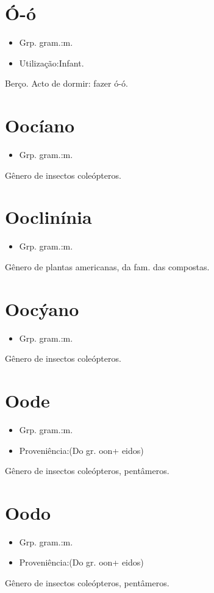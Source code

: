 \section{Ó-ó}
\begin{itemize}
\item {Grp. gram.:m.}
\end{itemize}
\begin{itemize}
\item {Utilização:Infant.}
\end{itemize}
Berço.
Acto de dormir: \textunderscore fazer ó-ó\textunderscore .
\section{Oocíano}
\begin{itemize}
\item {Grp. gram.:m.}
\end{itemize}
Gênero de insectos coleópteros.
\section{Ooclinínia}
\begin{itemize}
\item {Grp. gram.:m.}
\end{itemize}
Gênero de plantas americanas, da fam. das compostas.
\section{Oocýano}
\begin{itemize}
\item {Grp. gram.:m.}
\end{itemize}
Gênero de insectos coleópteros.
\section{Oode}
\begin{itemize}
\item {Grp. gram.:m.}
\end{itemize}
\begin{itemize}
\item {Proveniência:(Do gr. \textunderscore oon\textunderscore  + \textunderscore eidos\textunderscore )}
\end{itemize}
Gênero de insectos coleópteros, pentâmeros.
\section{Oodo}
\begin{itemize}
\item {Grp. gram.:m.}
\end{itemize}
\begin{itemize}
\item {Proveniência:(Do gr. \textunderscore oon\textunderscore  + \textunderscore eidos\textunderscore )}
\end{itemize}
Gênero de insectos coleópteros, pentâmeros.
